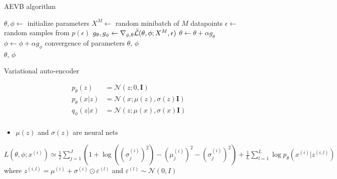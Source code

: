\documentclass[unicode,11pt]{beamer}
\begin{document}
\begin{frame}{AEVB algorithm}
  \centering
  \begin{algorithmic}
    \State $\theta, \phi \gets$ initialize parameters
    \Repeat
       \State $X^M \gets$ random minibatch of $M$ datapoints
       \State $\epsilon \gets$ random samples from $p(\epsilon)$
       \State $g_\theta, g_\phi \gets \nabla_{\phi, \theta} \mathcal{\tilde{L}}(\theta, \phi; X^M, \epsilon)$
       \State $\theta \gets \theta + \alpha g_\theta$
       \State $\phi \gets \phi + \alpha g_\phi$
    \Until convergence of parameters $\theta$, $\phi$ \\
    \Return $\theta$, $\phi$
  \end{algorithmic}
\end{frame}


\begin{frame}{Variational auto-encoder}
  \begin{center}
    \begin{minipage}[t]{.3\linewidth}
    \end{minipage}
    \begin{minipage}[t]{.55\linewidth}
      \begin{align*}
        p_\theta(z) &= \mathcal{N}(z; 0, \mathbf{I}) \\
        p_\theta(x|z) &= \mathcal{N}(x; \mu(z), \sigma(z) \mathbf{I}) \\
        q_\phi(z|x) &= \mathcal{N}(z; \mu(x), \sigma(x) \mathbf{I}) \\
      \end{align*}
    \end{minipage}
  \end{center}

  \begin{itemize}
  \item $\mu(z)$ and $\sigma(z)$ are neural nets
  \end{itemize}

  $L(\theta, \phi; x^{(i)}) \simeq \frac{1}{2} \sum\limits_{j=1}^J (1 + \log ((\sigma_j^{(i)})^2) -
  (\mu_j^{(i)})^2 - (\sigma_j^{(i)})^2) + \frac{1}{L} \sum\limits_{l=1}^L \log p_{\theta} (x^{(i)}|z^{(i,l)})$\\
  where $z^{(i,l)} = \mu^{(i)} + \sigma^{(i)} \odot \varepsilon^{(l)}$ and $\varepsilon^{(l)} \sim \mathcal{N}(0,I)$
\end{frame}
\end{document}
